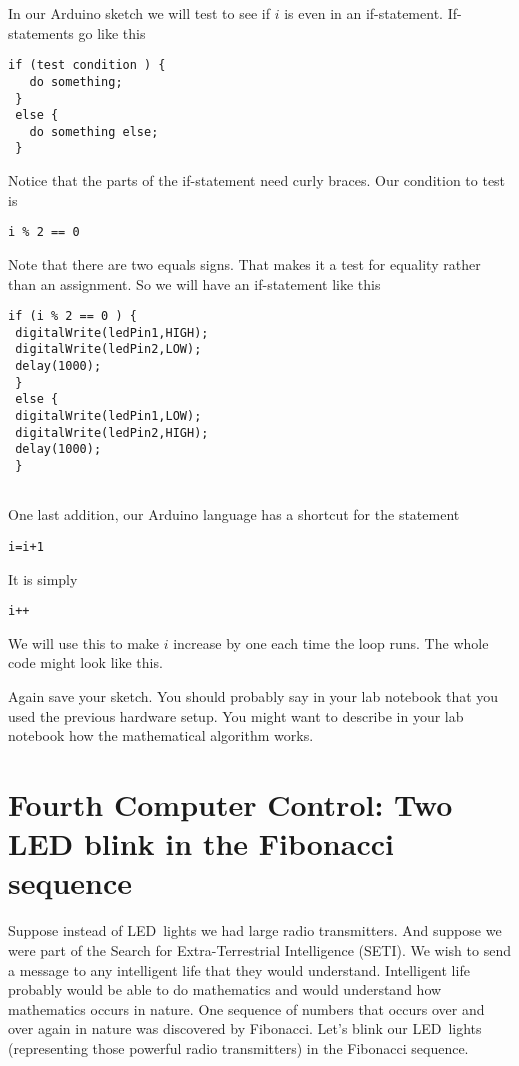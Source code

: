 In our Arduino sketch we will test to see if $i$ is even in an if-statement.
If-statements go like this
 \begin{lstlisting}[language=Arduino]
 if (test condition ) {
   do something;
 }
 else {
   do something else;
 }
 \end{lstlisting}

Notice that the parts of the if-statement need curly braces. Our condition
to test is
 \begin{lstlisting}[language=Arduino]
i % 2 == 0
 \end{lstlisting}

Note that there are two equals signs. That makes it a test for equality
rather than an assignment. So we will have an if-statement like this
 \begin{lstlisting}[language=Arduino]
if (i % 2 == 0 ) {
 digitalWrite(ledPin1,HIGH);
 digitalWrite(ledPin2,LOW);
 delay(1000);
 }
 else {
 digitalWrite(ledPin1,LOW);
 digitalWrite(ledPin2,HIGH);
 delay(1000);
 }
 
 \end{lstlisting}

One last addition, our Arduino language has a shortcut for the statement
 \begin{lstlisting}[language=Arduino]
i=i+1
 \end{lstlisting}

It is simply
 \begin{lstlisting}[language=Arduino]
i++
 \end{lstlisting}

We will use this to make $i$ increase by one each time the loop runs. The
whole code might look like this.




Again save your sketch. You should probably say in your lab notebook that
you used the previous hardware setup. You might want to describe in your lab
notebook how the mathematical algorithm works.

\section{Fourth Computer Control: Two LED blink in the Fibonacci sequence}

Suppose instead of LED\ lights we had large radio transmitters. And suppose
we were part of the Search for Extra-Terrestrial Intelligence (SETI). We
wish to send a message to any intelligent life that they would understand.
Intelligent life probably would be able to do mathematics and would
understand how mathematics occurs in nature. One sequence of numbers that
occurs over and over again in nature was discovered by Fibonacci. Let's
blink our LED\ lights (representing those powerful radio transmitters) in
the Fibonacci sequence.

